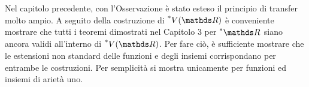 
Nel capitolo precedente, con l'Osservazione  è stato esteso il principio di transfer molto ampio. A seguito della costruzione di $ \nonstandard{V(\R)} $ è conveniente mostrare che tutti i teoremi dimostrati nel Capitolo 3 per $ \starR $ siano ancora validi all'interno di $ \nonstandard{V(\R)} $. Per fare ciò, è sufficiente mostrare che le estensioni non standard delle funzioni e degli insiemi corrispondano per entrambe le costruzioni. Per semplicità si mostra unicamente per funzioni ed insiemi di arietà uno.


